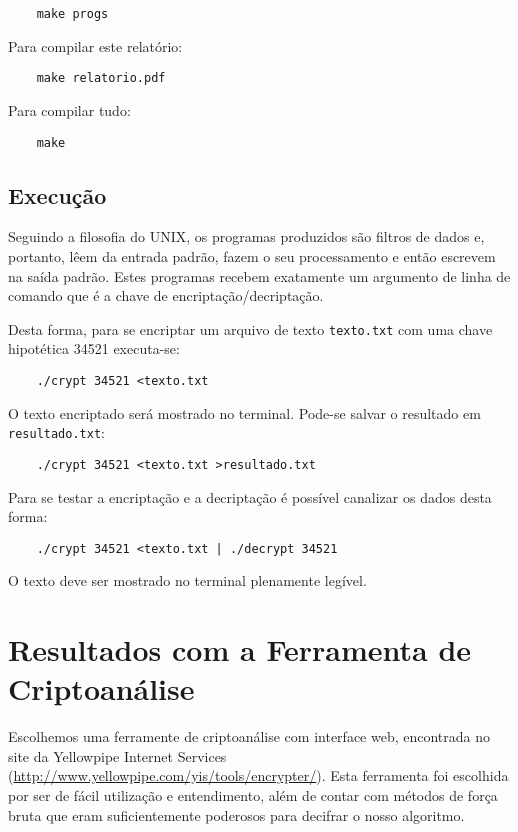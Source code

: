 \documentclass[12pt]{article}
\begin{document}
\begin{verbatim}
	make progs
\end{verbatim}

Para compilar este relatório:

\begin{verbatim}
	make relatorio.pdf
\end{verbatim}

Para compilar tudo:

\begin{verbatim}
	make
\end{verbatim}

\subsection{Execução}

Seguindo a filosofia do UNIX\textregistered, os programas produzidos são filtros de dados e, portanto, lêem
da entrada padrão, fazem o seu processamento e então escrevem na saída padrão. Estes programas recebem exatamente
um argumento de linha de comando que é a chave de encriptação/decriptação.

Desta forma, para se encriptar um arquivo de texto \texttt{texto.txt} com uma chave hipotética 34521 executa-se:

\begin{verbatim}
	./crypt 34521 <texto.txt
\end{verbatim}

O texto encriptado será mostrado no terminal. Pode-se salvar o resultado em \texttt{resultado.txt}:

\begin{verbatim}
	./crypt 34521 <texto.txt >resultado.txt
\end{verbatim}

Para se testar a encriptação e a decriptação é possível canalizar os dados desta forma:

\begin{verbatim}
	./crypt 34521 <texto.txt | ./decrypt 34521
\end{verbatim}

O texto deve ser mostrado no terminal plenamente legível.


\section{Resultados com a Ferramenta de Criptoanálise}

Escolhemos uma ferramente de criptoanálise com interface web, encontrada no site da
Yellowpipe Internet Services (\url{http://www.yellowpipe.com/yis/tools/encrypter/}).
Esta ferramenta foi escolhida por ser de fácil utilização e entendimento, além de contar com
métodos de força bruta que eram suficientemente poderosos para decifrar o nosso algoritmo.
\end{document}
